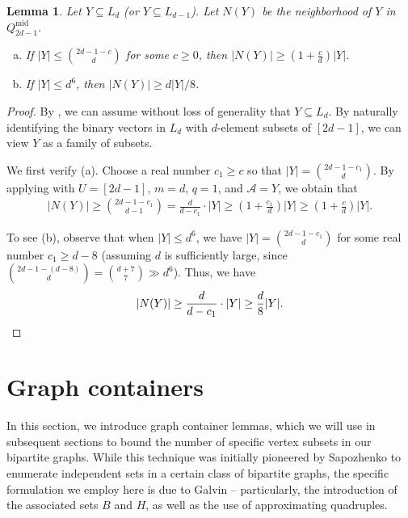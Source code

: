 \documentclass{amsart}
\newtheorem{lem}[thm]{Lemma}
\theoremstyle{definition}
\newcommand{\0}[0]{\emptyset}
\begin{document}
\begin{lem}\label{lem:isoperimetry}
    Let $Y\subseteq L_{d}$ (or $Y\subseteq L_{d-1}$). Let $N(Y)$ be the neighborhood of $Y$ in $Q_{2d-1}^{\mathrm{mid}}$.
\begin{enumerate}[(a)]
    \item If $|Y|\leq \binom{2d-1-c}{d}$ for some $c\geq 0$, then $|N(Y)|\geq \left(1+\frac{c}{d}\right)|Y|$.
    \item If $|Y|\leq d^6$, then $|N(Y)|\geq d|Y|/8$.
\end{enumerate}
\end{lem}

\begin{proof} 
By , we can assume without loss of generality that $Y\subseteq L_d$. By naturally identifying the binary vectors in $L_d$ with $d$-element subsets of $[2d-1]$, we can view $Y$ as a family of subsets.

We first verify (a). Choose a real number $c_1\geq c$ so that $|Y|=\binom{2d-1-c_1}{d}$. By applying  with $U=[2d-1]$, $m=d$, $q=1$, and $\mathcal A=Y$, we obtain that
\begin{align*}
    |N(Y)| \geq \binom{2d-1-c_1}{d-1} = \frac{d}{d-c_1}\cdot |Y| \geq \left(1+\frac{c_1}{d}\right)|Y| \geq \left(1+\frac{c}{d}\right)|Y|.
\end{align*}   

To see (b), observe that when $|Y|\leq d^6$, we have $|Y|=\binom{2d-1-c_1}{d}$ for some real number $c_1\geq d-8$ (assuming $d$ is sufficiently large, since $\binom{2d-1-(d-8)}{d} = \binom{d+7}{7} \gg d^6$). Thus, we have 
\[
    |N(Y)| \geq \frac{d}{d-c_1}\cdot |Y| \geq \frac{d}{8}|Y|. \qedhere
\]
\end{proof}

\section{Graph containers}\label{sec:containers}

In this section, we introduce graph container lemmas, which we will use in subsequent sections to bound the number of specific vertex subsets in our bipartite graphs. While this technique was initially pioneered by Sapozhenko \cite{sapozhenko1987number} to enumerate independent sets in a certain class of bipartite graphs, the specific formulation we employ here is due to Galvin \cite{galvin2003homomorphisms} -- particularly, the introduction of the associated sets $B$ and $H$, as well as the use of approximating quadruples.
\end{document}
